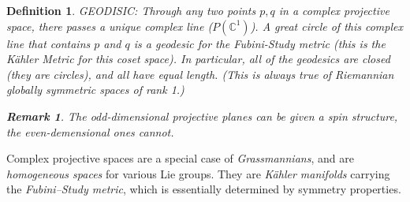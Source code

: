 \documentclass[aps,preprint]{revtex4}%
\newtheorem{definition}[theorem]{Definition}
\newtheorem{remark}[theorem]{Remark}
\begin{document}
\begin{definition}
\emph{GEODISIC: }Through any two points $p,q$ in a \emph{complex projective
space}, there passes a unique complex line ($P\left(  \mathbb{C}^{1}\right)
$). A great circle of this complex line that contains $p$ and $q$ is a
\emph{geodesic} for the \emph{Fubini-Study} metric (this is the
\emph{K\"{a}hler Metric} for this coset space). In particular, all of the
geodesics are closed (they are circles), and all have equal length. (This is
always true of Riemannian globally symmetric spaces of rank 1.)

\begin{remark}
The odd-dimensional projective planes can be given a spin structure, the
even-demensional ones cannot.
\end{remark}
\end{definition}

Complex projective spaces are a special case of \emph{Grassmannians}, and are
\emph{homogeneous spaces} for various Lie groups. They are \emph{K\"{a}hler
manifolds} carrying the \emph{Fubini--Study metric}, which is essentially
determined by symmetry properties.
\end{document}
